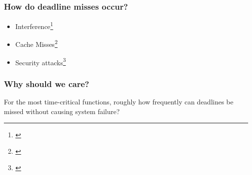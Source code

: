 \begin{frame}
    \frametitle{How do deadline misses occur?}
    \begin{itemize}\setlength\itemsep{1em}
        \item Interference\footnote{\cite{Stankovic:1995, Bernat:2001}}
        \item Cache Misses\footnote{\cite{Milligan:1996, Wang:2012, Altmeyer:2014, Davis:2013}}
        \item Security attacks\footnote{\cite{hashemi2018comparison, sabaliauskaite2017comparison, Knorn:2019}}
    \end{itemize}
\end{frame}

\begin{frame}
    \frametitle{Why should we care?}
    For the most time-critical functions, roughly how frequently can deadlines be missed without causing system failure?~\parencite{Akesson:2020}
    \begin{figure}[h]
        \centering
        
    \end{figure}
\end{frame}
